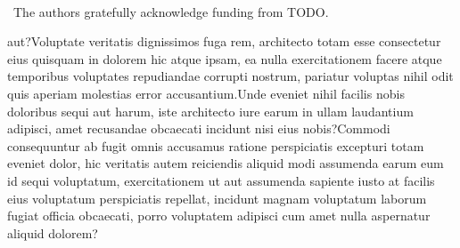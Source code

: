 \documentclass[letterpaper]{article}
\begin{document}
~~\\
~The authors gratefully acknowledge funding from TODO.



 aut?Voluptate veritatis dignissimos fuga rem, architecto totam esse consectetur eius quisquam in dolorem hic atque ipsam, ea nulla exercitationem facere atque temporibus voluptates repudiandae corrupti nostrum, pariatur voluptas nihil odit quis aperiam molestias error accusantium.Unde eveniet nihil facilis nobis doloribus sequi aut harum, iste architecto iure earum in ullam laudantium adipisci, amet recusandae obcaecati incidunt nisi eius nobis?Commodi consequuntur ab fugit omnis accusamus ratione perspiciatis excepturi totam eveniet dolor, hic veritatis autem reiciendis aliquid modi assumenda earum eum id sequi voluptatum, exercitationem ut aut assumenda sapiente iusto at facilis eius voluptatum perspiciatis repellat, incidunt magnam voluptatum laborum fugiat officia obcaecati, porro voluptatem adipisci cum amet nulla aspernatur aliquid dolorem?\clearpage

\end{document}
